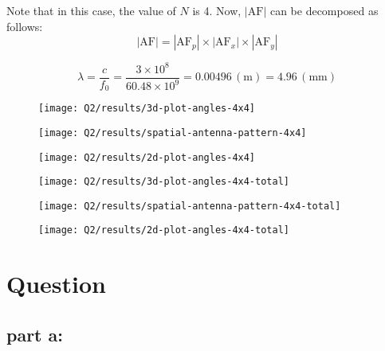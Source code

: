 \documentclass[12pt,onecolumn,a4paper]{article}
\newcommand\question{
	\section{Question \numberstringnum{\thesection}}
}
\begin{document}
	Note that in this case, the value of $N$ is 4.
	Now, $|\text{AF}| $ can be decomposed as follows:
	\begin{equation}
		|\text{AF}| = |\text{AF}_p| \times |\text{AF}_x| \times |\text{AF}_y|
	\end{equation}
	
	
	\begin{equation}
		\lambda = \frac{c}{f_0} = \frac{3 \times 10^8}{60.48 \times 10^9} = 0.00496 \, (\mathrm{m}) = 4.96 \, (\mathrm{mm})
	\end{equation}

	\begin{figure}[H]
		\centering
		\texttt{[image: Q2/results/3d-plot-angles-4x4]}
		\caption{}
		\label{fig:3d-plot-angles-4x4}
	\end{figure}
	
	\begin{figure}[H]
		\centering
		\texttt{[image: Q2/results/spatial-antenna-pattern-4x4]}
		\caption{}
		\label{fig:spatial-antenna-pattern-4x4}
	\end{figure}
	\begin{figure}[H]
		\centering
		\texttt{[image: Q2/results/2d-plot-angles-4x4]}
		\caption{}
		\label{fig:2d-plot-angles-4x4}
	\end{figure}
	
\begin{figure}[H]
	\centering
	\texttt{[image: Q2/results/3d-plot-angles-4x4-total]}
	\caption{}
	\label{fig:3d-plot-angles-4x4-total}
\end{figure}
\begin{figure}[H]
	\centering
	\texttt{[image: Q2/results/spatial-antenna-pattern-4x4-total]}
	\caption{}
	\label{fig:spatial-antenna-pattern-4x4-total}
\end{figure}
\begin{figure}[H]
	\centering
	\texttt{[image: Q2/results/2d-plot-angles-4x4-total]}
	\caption{}
	\label{fig:2d-plot-angles-4x4-total}
\end{figure}


	\FloatBarrier
	\question%

	
	\FloatBarrier
	\subsection{part a:}
	
\end{document}
